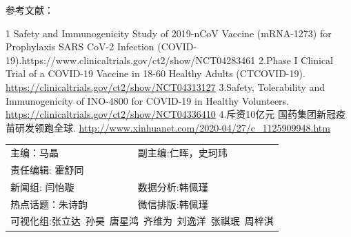 \documentclass[
]{article}
\begin{document}
\Large 参考文献：

1 Safety and Immunogenicity Study of 2019-nCoV Vaccine (mRNA-1273) for
Prophylaxis SARS CoV-2 Infection
(COVID-19).https://www.clinicaltrials.gov/ct2/show/NCT04283461 2.Phase I
Clinical Trial of a COVID-19 Vaccine in 18-60 Healthy Adults
(CTCOVID-19). \url{https://clinicaltrials.gov/ct2/show/NCT04313127}
3.Safety, Tolerability and Immunogenicity of INO-4800 for COVID-19 in
Healthy Volunteers.
\url{https://clinicaltrials.gov/ct2/show/NCT04336410} 4.斥资10亿元
国药集团新冠疫苗研发领跑全球.
\url{http://www.xinhuanet.com/2020-04/27/c_1125909948.htm}

\vspace{5mm}

\centering
\fontsize{12}{12}
\selectfont
\begin{tabular}{ll}


主编：马晶  &  副主编:仁晖，史珂玮 \\
责任编辑: 霍舒同  \\
新闻组: 闫怡璇 &  数据分析:韩佩瑾 \\
热点话题：朱诗韵 & 微信排版:韩佩瑾 \\
\multicolumn{2}{l}{可视化组:张立达\, 孙昊\, 唐星鸿\, 齐维为\, 刘逸洋\, 张祺珉\, 周梓淇}

\end{tabular}
\end{document}
